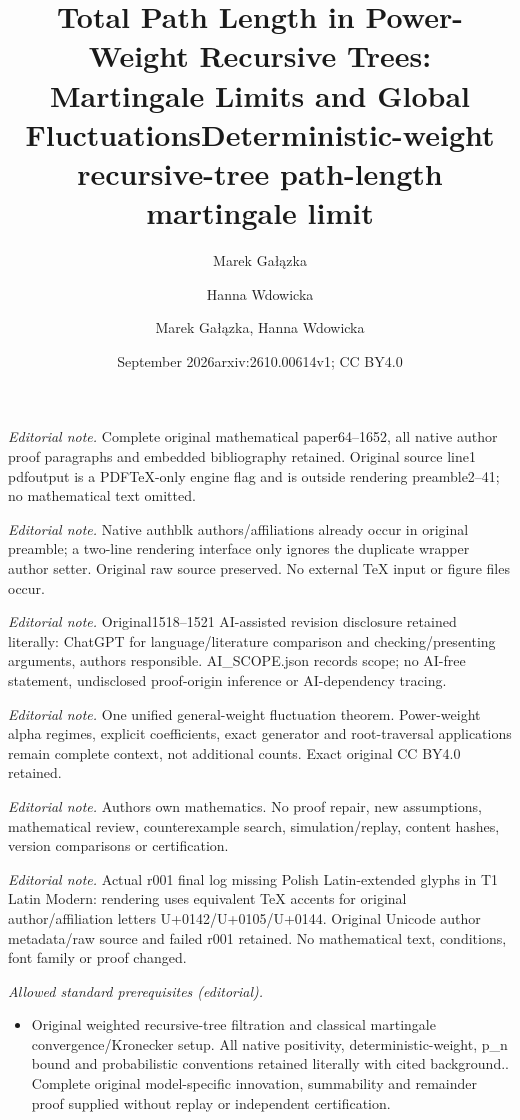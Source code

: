 \documentclass[11pt,a4paper]{article}
\title{\bfseries Total Path Length in Power-Weight Recursive Trees:\\
Martingale Limits and Global Fluctuations}
\author[1]{Marek Ga\l{}\k{a}zka}
\author[2]{Hanna Wdowicka}
\affil[1]{Faculty of Mathematics and Computer Science, Adam Mickiewicz University, Pozna\'n, Poland}
\affil[2]{Department of Statistics, Pozna\'n University of Economics and Business, Poland}
\date{September 2026}
\title{Deterministic-weight recursive-tree path-length martingale limit}
\author{Marek Gałązka, Hanna Wdowicka}
\date{arxiv:2610.00614v1; CC BY4.0}
\newcommand{\1}{\mathbf{1}}
\begin{document}
\maketitle
\noindent\textit{Editorial note.} Complete original mathematical paper64--1652, all native author proof paragraphs and embedded bibliography retained. Original source line1 pdfoutput is a PDFTeX-only engine flag and is outside rendering preamble2--41; no mathematical text omitted.\par\medskip
\noindent\textit{Editorial note.} Native authblk authors/affiliations already occur in original preamble; a two-line rendering interface only ignores the duplicate wrapper author setter. Original raw source preserved. No external TeX input or figure files occur.\par\medskip
\noindent\textit{Editorial note.} Original1518--1521 AI-assisted revision disclosure retained literally: ChatGPT for language/literature comparison and checking/presenting arguments, authors responsible. AI\_SCOPE.json records scope; no AI-free statement, undisclosed proof-origin inference or AI-dependency tracing.\par\medskip
\noindent\textit{Editorial note.} One unified general-weight fluctuation theorem. Power-weight alpha regimes, explicit coefficients, exact generator and root-traversal applications remain complete context, not additional counts. Exact original CC BY4.0 retained.\par\medskip
\noindent\textit{Editorial note.} Authors own mathematics. No proof repair, new assumptions, mathematical review, counterexample search, simulation/replay, content hashes, version comparisons or certification.\par\medskip
\noindent\textit{Editorial note.} Actual r001 final log missing Polish Latin-extended glyphs in T1 Latin Modern: rendering uses equivalent TeX accents for original author/affiliation letters U+0142/U+0105/U+0144. Original Unicode author metadata/raw source and failed r001 retained. No mathematical text, conditions, font family or proof changed.\par\medskip
\noindent\textit{Allowed standard prerequisites (editorial).}\begin{itemize}
\item Original weighted recursive-tree filtration and classical martingale convergence/Kronecker setup. All native positivity, deterministic-weight, p\_n bound and probabilistic conventions retained literally with cited background.. Complete original model-specific innovation, summability and remainder proof supplied without replay or independent certification.
\end{itemize}\medskip
\end{document}
